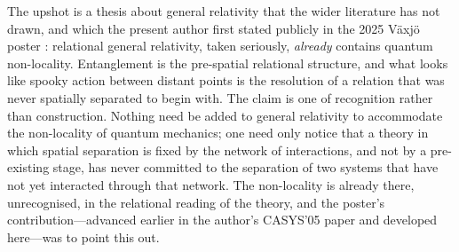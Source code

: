 %
%

The upshot is a thesis about general relativity that the wider literature has not
drawn, and which the present author first stated publicly in the 2025 V\"axj\"o
poster \autocite{Small2025}: relational general relativity, taken seriously,
\emph{already} contains quantum non-locality. Entanglement is the pre-spatial
relational structure, and what looks like spooky action between distant points is
the resolution of a relation that was never spatially separated to begin with. The
claim is one of recognition rather than construction. Nothing need be added to
general relativity to accommodate the non-locality of quantum mechanics; one need
only notice that a theory in which spatial separation is fixed by the network of
interactions, and not by a pre-existing stage, has never committed to the
separation of two systems that have not yet interacted through that network. The
non-locality is already there, unrecognised, in the relational reading of the
theory, and the poster's contribution---advanced earlier in the author's CASYS'05
paper \autocite{small_2006} and developed here---was to point this out.

